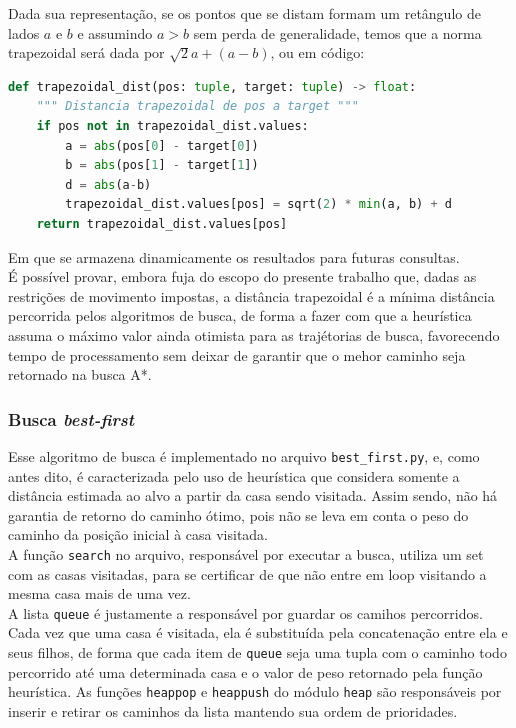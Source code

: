\documentclass[12pt]{article}
\begin{document}
Dada sua representação, se os pontos que se distam formam um retângulo de lados \(a\) e \(b\) e assumindo \(a > b\) sem perda de generalidade, temos que a norma trapezoidal será dada por \(\sqrt{2}a + (a - b)\), ou em código:\\

\begin{lstlisting}[language=Python]
def trapezoidal_dist(pos: tuple, target: tuple) -> float:
    """ Distancia trapezoidal de pos a target """
    if pos not in trapezoidal_dist.values:
        a = abs(pos[0] - target[0])
        b = abs(pos[1] - target[1])
        d = abs(a-b)
        trapezoidal_dist.values[pos] = sqrt(2) * min(a, b) + d
    return trapezoidal_dist.values[pos]
\end{lstlisting}

Em que se armazena dinamicamente os resultados para futuras consultas.\\

É possível provar, embora fuja do escopo do presente trabalho que, dadas as restrições de movimento impostas, a distância trapezoidal é a mínima distância percorrida pelos algoritmos de busca, de forma a fazer com que a heurística assuma o máximo valor ainda otimista para as trajétorias de busca, favorecendo tempo de processamento sem deixar de garantir que o mehor caminho seja retornado na busca A*.

\subsubsection{Busca \emph{best-first}}

Esse algoritmo de busca é implementado no arquivo \verb|best_first.py|, e, como antes dito, é caracterizada pelo uso de heurística que considera somente a distância estimada ao alvo a partir da casa sendo visitada. Assim sendo, não há garantia de retorno do caminho ótimo, pois não se leva em conta o peso do caminho da posição inicial à casa visitada.\\

A função \verb|search| no arquivo, responsável por executar a busca, utiliza um set com as casas visitadas, para se certificar de que não entre em loop visitando a mesma casa mais de uma vez.\\

A lista \verb|queue| é justamente a responsável por guardar os camihos percorridos. Cada vez que uma casa é visitada, ela é substituída pela concatenação entre ela e seus filhos, de forma que cada item de \verb|queue| seja uma tupla com o caminho todo percorrido até uma determinada casa e o valor de peso retornado pela função heurística. As funções \verb|heappop| e \verb|heappush| do módulo \verb|heap| são responsáveis por inserir e retirar os caminhos da lista mantendo sua ordem de prioridades.\\
\end{document}
